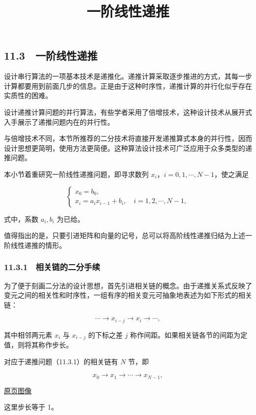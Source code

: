 \documentclass[
  10pt,
  fontset=fandol]{ctexart}
\title{一阶线性递推}
\author{}
\date{}
\begin{document}
\maketitle

\subsection{11.3　一阶线性递推}\label{ux4e00ux9636ux7ebfux6027ux9012ux63a8}

设计串行算法的一项基本技术是递推化。递推计算采取逐步推进的方式，其每一步计算都要用到前面几步的信息。正是由于这种时序性，递推计算的并行化似乎存在实质性的困难。

设计递推计算问题的并行算法，有些学者采用了倍增技术，这种设计技术从展开式入手展示了递推问题内在的并行性。

与倍增技术不同，本节所推荐的二分技术将直接开发递推算式本身的并行性，因而设计思想更简明，使用方法更简便。这种算法设计技术可广泛应用于众多类型的递推问题。

本小节着重研究一阶线性递推问题，即寻求数列 \(x_i\)，\(i=0,1,\cdots,N-1\)，使之满足

\[
\begin{cases}
x_0=b_0,\\
x_i=a_i x_{i-1}+b_i,\quad i=1,2,\cdots,N-1,
\end{cases}
\tag{11.3.1}
\]

式中，系数 \(a_i,b_i\) 为已给。

值得指出的是，只要引进矩阵和向量的记号，总可以将高阶线性递推归结为上述一阶线性递推的情形。

\subsubsection{11.3.1　相关链的二分手续}\label{ux76f8ux5173ux94feux7684ux4e8cux5206ux624bux7eed}

为了便于刻画二分法的设计思想，首先引进相关链的概念。由于递推关系式反映了变元之间的相关性和时序性，一组有序的相关变元可抽象地表述为如下形式的相关链：

\[
\cdots\to x_{i-j}\to x_i\to\cdots,
\]

其中相邻两元素 \(x_i\) 与 \(x_{i-j}\) 的下标之差 \(j\) 称作间距。如果相关链各节的间距为定值，则将其称作步长。

对应于递推问题（11.3.1）的相关链有 \(N\) 节，即

\[
x_0\to x_1\to\cdots\to x_{N-1},
\]

\href{../../source-images/pdf-286.jpeg}{原页图像}

这里步长等于 1。
\end{document}
